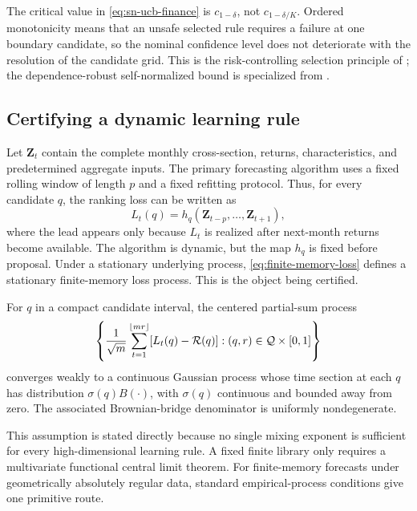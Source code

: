 The critical value in \eqref{eq:sn-ucb-finance} is $c_{1-\delta}$, not $c_{1-\delta/K}$. Ordered monotonicity means that an unsafe selected rule requires a failure at one boundary candidate, so the nominal confidence level does not deteriorate with the resolution of the candidate grid. This is the risk-controlling selection principle of \citet{BatesEtAl2021}; the dependence-robust self-normalized bound is specialized from \citet{Bignozzi2026SNRCPS}.

\subsection{Certifying a dynamic learning rule}

Let $\bm Z_t$ contain the complete monthly cross-section, returns, characteristics, and predetermined aggregate inputs. The primary forecasting algorithm uses a fixed rolling window of length $p$ and a fixed refitting protocol. Thus, for every candidate $q$, the ranking loss can be written as
\begin{equation}
L_t(q)
=
h_q(\bm Z_{t-p},\ldots,\bm Z_{t+1}),
\label{eq:finite-memory-loss}
\end{equation}
where the lead appears only because $L_t$ is realized after next-month returns become available. The algorithm is dynamic, but the map $h_q$ is fixed before proposal. Under a stationary underlying process, \eqref{eq:finite-memory-loss} defines a stationary finite-memory loss process. This is the object being certified.

\begin{assumption}
\label{ass:finance-fclt}
For $q$ in a compact candidate interval, the centered partial-sum process
\[
\left\{
\frac1{\sqrt m}
\sum_{t=1}^{\lfloor mr\rfloor}
[L_t(q)-\mathcal R(q)]
:(q,r)\in\mathcal Q\times[0,1]
\right\}
\]
converges weakly to a continuous Gaussian process whose time section at each $q$ has distribution $\sigma(q)B(\cdot)$, with $\sigma(q)$ continuous and bounded away from zero. The associated Brownian-bridge denominator is uniformly nondegenerate.
\end{assumption}

This assumption is stated directly because no single mixing exponent is sufficient for every high-dimensional learning rule. A fixed finite library only requires a multivariate functional central limit theorem. For finite-memory forecasts under geometrically absolutely regular data, standard empirical-process conditions give one primitive route.

